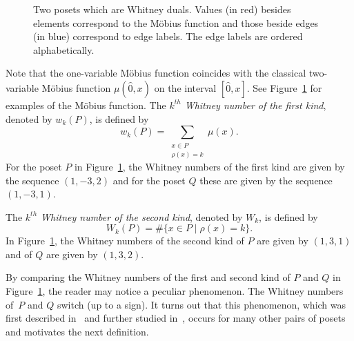 \documentclass[11pt]{article}
\theoremstyle{definition}
\numberwithin{equation}{section}
\begin{document}
\begin{figure}
    \caption{Two posets which are Whitney duals.  Values (in red) besides elements correspond to the M\"obius function and those beside edges (in blue) correspond to edge labels.  The edge labels are ordered alphabetically.}\label{fig:WhitneyDualExample}
\end{figure}

Note that the one-variable M\"obius function coincides with the classical two-variable M\"obius function $\mu(\hat{0},x)$ on the interval $[\hat{0},x]$. See Figure~\ref{fig:WhitneyDualExample}  for examples of the M\"obius function.    The \emph{$k^{th}$ Whitney number of the first kind}, denoted by $w_k(P)$,  is defined by
$$
w_k(P) = \sum_{\substack{x\in P\\ \rho(x) = k}} \mu(x).
$$
For the poset  $P$ in Figure~\ref{fig:WhitneyDualExample}, the Whitney numbers of the first kind are given by the sequence $(1, -3 ,2)$ and for the poset $Q$ these are given by the sequence $(1,-3,1)$.  

 The \emph{$k^{th}$ Whitney number of the second kind}, denoted by $W_k$, is defined by 
 $$
 W_k(P) =  \#\{x\in P \mid \rho(x)=k\}.
 $$
In Figure~\ref{fig:WhitneyDualExample}, the Whitney numbers of the second  kind of $P$ are given by $(1, 3, 1)$ and of $Q$ are given by $(1, 3 , 2)$.  

By comparing the Whitney numbers of the first and second kind of $P$ and $Q$ in Figure~\ref{fig:WhitneyDualExample}, the reader may notice a peculiar phenomenon. The Whitney numbers of~$P$ and $Q$  switch (up to a sign).  It turns out that this phenomenon, which was first described in~\cite{GonzalezHallam2017} and further studied in~\cite{GonzalezHallam2021}, occurs for many other pairs of posets and motivates the next definition.
\end{document}
